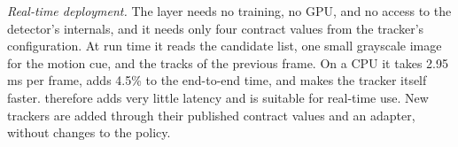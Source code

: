 \emph{Real-time deployment.} The layer needs no training, no GPU, and no
access to the detector's internals, and it needs only four contract values
from the tracker's configuration. At run time it reads the candidate list, one
small grayscale image for the motion cue, and the tracks of the previous
frame. On a CPU it takes 2.95 ms per frame, adds 4.5\% to the end-to-end time, and makes the tracker
itself faster. \scl{} therefore adds very little latency and is
suitable for real-time use. New trackers are added through their published
contract values and an adapter, without changes to the policy.
